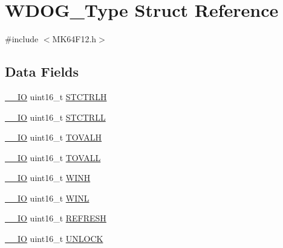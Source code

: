 \hypertarget{struct_w_d_o_g___type}{}\section{W\+D\+O\+G\+\_\+\+Type Struct Reference}
\label{struct_w_d_o_g___type}


{\ttfamily \#include $<$M\+K64\+F12.\+h$>$}

\subsection*{Data Fields}
\begin{DoxyCompactItemize}
\item 
\mbox{\hyperlink{core__cm4_8h_aec43007d9998a0a0e01faede4133d6be}{\+\_\+\+\_\+\+IO}} uint16\+\_\+t \mbox{\hyperlink{group___v_r_e_f___peripheral___access___layer_gad4d85fbd5ff5d1ba1aeb7e49adb9b1fd}{S\+T\+C\+T\+R\+LH}}
\item 
\mbox{\hyperlink{core__cm4_8h_aec43007d9998a0a0e01faede4133d6be}{\+\_\+\+\_\+\+IO}} uint16\+\_\+t \mbox{\hyperlink{group___v_r_e_f___peripheral___access___layer_gaab3e807406cde45883ef340be06568cb}{S\+T\+C\+T\+R\+LL}}
\item 
\mbox{\hyperlink{core__cm4_8h_aec43007d9998a0a0e01faede4133d6be}{\+\_\+\+\_\+\+IO}} uint16\+\_\+t \mbox{\hyperlink{group___v_r_e_f___peripheral___access___layer_ga23960179757a36ca719156a5c90c8675}{T\+O\+V\+A\+LH}}
\item 
\mbox{\hyperlink{core__cm4_8h_aec43007d9998a0a0e01faede4133d6be}{\+\_\+\+\_\+\+IO}} uint16\+\_\+t \mbox{\hyperlink{group___v_r_e_f___peripheral___access___layer_ga9ccb8f22716c09c39bb0cfd02aba69f4}{T\+O\+V\+A\+LL}}
\item 
\mbox{\hyperlink{core__cm4_8h_aec43007d9998a0a0e01faede4133d6be}{\+\_\+\+\_\+\+IO}} uint16\+\_\+t \mbox{\hyperlink{group___v_r_e_f___peripheral___access___layer_gaa1bde3a7b29baa67659b12f0a4a494ac}{W\+I\+NH}}
\item 
\mbox{\hyperlink{core__cm4_8h_aec43007d9998a0a0e01faede4133d6be}{\+\_\+\+\_\+\+IO}} uint16\+\_\+t \mbox{\hyperlink{group___v_r_e_f___peripheral___access___layer_gaced61c61e5299b565e8b257e59562d85}{W\+I\+NL}}
\item 
\mbox{\hyperlink{core__cm4_8h_aec43007d9998a0a0e01faede4133d6be}{\+\_\+\+\_\+\+IO}} uint16\+\_\+t \mbox{\hyperlink{group___v_r_e_f___peripheral___access___layer_gad6e11b03f76f4f5c7f7af63c6adf72ef}{R\+E\+F\+R\+E\+SH}}
\item 
\mbox{\hyperlink{core__cm4_8h_aec43007d9998a0a0e01faede4133d6be}{\+\_\+\+\_\+\+IO}} uint16\+\_\+t \mbox{\hyperlink{group___v_r_e_f___peripheral___access___layer_gae5d5ccb6817e2e1e51eac125b01856de}{U\+N\+L\+O\+CK}}

\end{DoxyCompactItemize}
